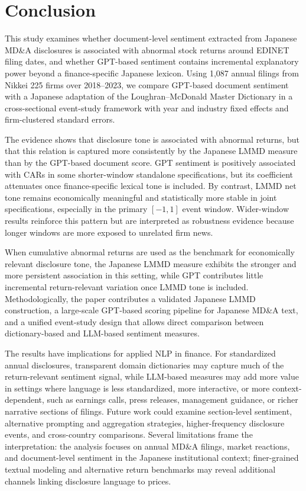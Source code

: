 \section{Conclusion}
\label{sec:conclusion}

This study examines whether document-level sentiment extracted from Japanese
MD\&A disclosures is associated with abnormal stock returns around EDINET
filing dates, and whether GPT-based sentiment contains incremental explanatory
power beyond a finance-specific Japanese lexicon. Using 1,087 annual filings
from Nikkei 225 firms over 2018--2023, we compare GPT-based document sentiment
with a Japanese adaptation of the Loughran--McDonald Master Dictionary in a
cross-sectional event-study framework with year and industry fixed effects and
firm-clustered standard errors.

The evidence shows that disclosure tone is associated with abnormal returns, but that this relation is captured more consistently by the
Japanese LMMD measure than by the GPT-based document score. GPT sentiment is
positively associated with CARs in some shorter-window standalone
specifications, but its coefficient attenuates once finance-specific lexical
tone is included. By contrast, LMMD net tone remains economically meaningful
and statistically more stable in joint specifications, especially in the
primary $[-1,1]$ event window. Wider-window results reinforce this pattern but
are interpreted as robustness evidence because longer windows are more exposed
to unrelated firm news.

When cumulative abnormal returns are used as the benchmark for economically relevant disclosure tone, the Japanese LMMD measure exhibits the stronger and more persistent association in this setting, while GPT contributes little incremental return-relevant variation once LMMD tone is included. Methodologically, the paper contributes a
validated Japanese LMMD construction, a large-scale GPT-based scoring pipeline
for Japanese MD\&A text, and a unified event-study design that allows direct
comparison between dictionary-based and LLM-based sentiment measures.

The results have implications for applied NLP in finance. For standardized
annual disclosures, transparent domain dictionaries may capture much of the
return-relevant sentiment signal, while LLM-based measures may add more value
in settings where language is less standardized, more interactive, or more
context-dependent, such as earnings calls, press releases, management guidance,
or richer narrative sections of filings. Future work could examine section-level
sentiment, alternative prompting and aggregation strategies, higher-frequency
disclosure events, and cross-country comparisons. Several limitations frame the
interpretation: the analysis focuses on annual MD\&A filings, market reactions,
and document-level sentiment in the Japanese institutional context; finer-grained
textual modeling and alternative return benchmarks may reveal additional
channels linking disclosure language to prices.